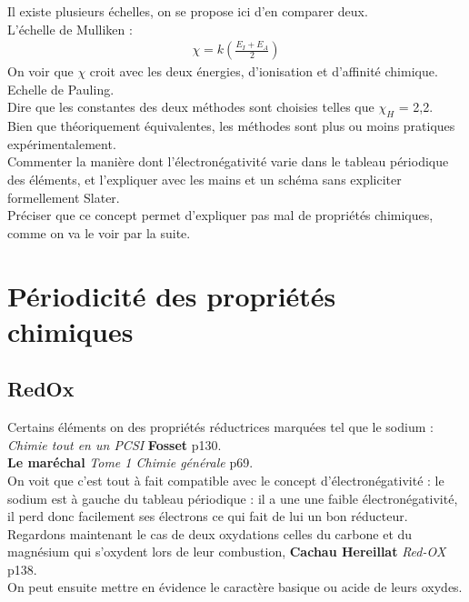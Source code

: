 \documentclass[12pt,prb,aps,epsf]{article}
\begin{document}
Il existe plusieurs échelles, on se propose ici d'en comparer deux.\\
L'échelle de Mulliken : 
\begin{eqnarray}
\chi = k\left(\frac{E_I + E_A}{2}\right) 
\end{eqnarray}
On voir que $\chi$ croit avec les deux énergies, d'ionisation et d'affinité chimique.\\
Echelle de Pauling.\\

Dire que les constantes des deux méthodes sont choisies telles que $\chi_{H}$ = 2,2.\\

Bien que théoriquement équivalentes, les méthodes sont plus ou moins pratiques expérimentalement.\\

Commenter la manière dont l'électronégativité  varie dans le tableau périodique des éléments, et l'expliquer avec les mains et un schéma sans expliciter formellement Slater.\\

Préciser que ce concept permet d'expliquer pas mal de propriétés chimiques, comme on va le voir par la suite.

\section{Périodicité des propriétés chimiques}
\subsection{RedOx}
Certains éléments on des propriétés réductrices marquées tel que le sodium :\\
\textit{Chimie tout en un PCSI} \textbf{Fosset} p130.\\
 \textbf{Le maréchal} \textit{Tome 1 Chimie générale} p69.\\
 On voit que c'est tout à fait compatible avec le concept d'électronégativité : le sodium est à gauche du tableau périodique : il a une une faible électronégativité, il perd donc facilement ses électrons ce qui fait de lui un bon réducteur.\\
 
 Regardons maintenant le cas de deux oxydations celles du carbone et du magnésium qui s'oxydent lors de leur combustion, \textbf{Cachau Hereillat} \textit{Red-OX} p138.\\
 
 On peut ensuite mettre en évidence le caractère basique ou acide de leurs oxydes.
  
\end{document}
